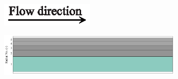 \documentclass[preprint,12pt]{elsarticle}
\begin{document}
\begin{figure}[h!]
     \centering
     \begin{subfigure}[b]{\textwidth}
     	\includegraphics[width=\textwidth]{flow_dir.eps}
     \end{subfigure}
     \begin{subfigure}[b]{0.85\textwidth}
\includegraphics[width=\textwidth]{results/segments/5segEq/80C20T/seg.png}
     \end{subfigure}
     \hfill
     \begin{subfigure}[b]{0.1\textwidth}

\end{subfigure}
\end{figure}
\end{document}
